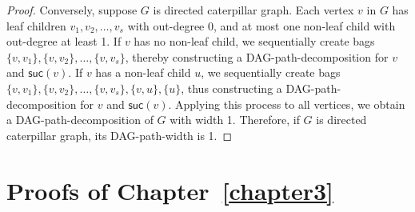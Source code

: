 \documentclass[runningheads]{llncs}
\theoremstyle{plain}
\theoremstyle{definition}
\begin{document}
\begin{proof}
    Conversely, suppose $G$ is directed caterpillar graph. Each vertex $v$ in $G$ has leaf children $v_1, v_2, \dots, v_s$ with out-degree 0, and at most one non-leaf child with out-degree at least 1. If $v$ has no non-leaf child, we sequentially create bags $\{v, v_1\}, \{v, v_2\}, \dots, \{v, v_s\}$, thereby constructing a DAG-path-decomposition for $v$ and $\mathsf{suc}(v)$. If $v$ has a non-leaf child $u$, we sequentially create bags $\{v, v_1\}, \{v, v_2\}, \dots, \{v, v_s\}, \{v, u\}, \{u\}$, thus constructing a DAG-path-decomposition for $v$ and $\mathsf{suc}(v)$. Applying this process to all vertices, we obtain a DAG-path-decomposition of $G$ with width 1. Therefore, if $G$ is directed caterpillar graph, its DAG-path-width is 1.
\end{proof}






\section{Proofs of Chapter~\ref{chapter3}}
\end{document}
